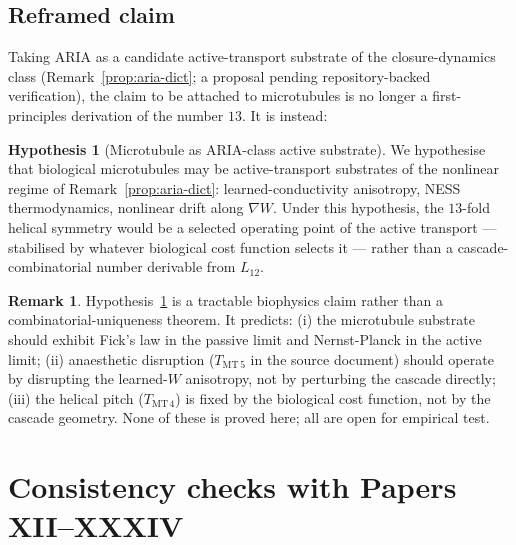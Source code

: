 \documentclass[11pt]{article}
\theoremstyle{definition}
\newtheorem{remark}[theorem]{Remark}
\newtheorem{hypothesis}[theorem]{Hypothesis}
\begin{document}
\subsection{Reframed claim}

Taking ARIA as a candidate active-transport substrate of the closure-dynamics class (Remark~\ref{prop:aria-dict}; a proposal pending repository-backed verification), the claim to be attached to microtubules is no longer a first-principles derivation of the number $13$. It is instead:

\begin{hypothesis}[Microtubule as ARIA-class active substrate]\label{hyp:mt}
We hypothesise that biological microtubules may be active-transport substrates of the nonlinear regime of Remark~\ref{prop:aria-dict}: learned-conductivity anisotropy, NESS thermodynamics, nonlinear drift along $\nabla W$. Under this hypothesis, the $13$-fold helical symmetry would be a selected operating point of the active transport --- stabilised by whatever biological cost function selects it --- rather than a cascade-combinatorial number derivable from $L_{12}$.
\end{hypothesis}

\begin{remark}
Hypothesis~\ref{hyp:mt} is a tractable biophysics claim rather than a combinatorial-uniqueness theorem. It predicts: (i) the microtubule substrate should exhibit Fick's law in the passive limit and Nernst-Planck in the active limit; (ii) anaesthetic disruption ($T_{\text{MT}\,5}$ in the source document) should operate by disrupting the learned-$W$ anisotropy, not by perturbing the cascade directly; (iii) the helical pitch ($T_{\text{MT}\,4}$) is fixed by the biological cost function, not by the cascade geometry. None of these is proved here; all are open for empirical test.
\end{remark}

\section{Consistency checks with Papers XII--XXXIV}\label{sec:consistency}
\end{document}
